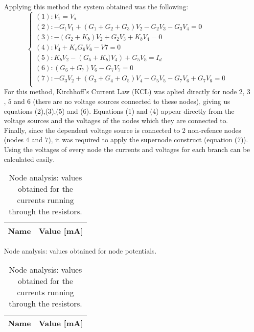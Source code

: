 Applying this method the system obtained was the following:
\begin{equation}
  \begin{cases}
    \left(1\right): V_{1}=V_{a}                                                                        \\
    \left(2\right): -G_{1}V_{1}+\left(G_{1}+G_{2}+G_{3}\right)V_{2}-G_{2}V_{3}-G_{3}V_{4}=0            \\
    \left(3\right): -\left(G_{2}+K_{b}\right)V_{2}+G_{2}V_{3}+K_{b}V_{4}=0                             \\
    \left(4\right): V_{4}+K_{c}G_{6}V_{6}-V{7}=0                                                       \\
    \left(5\right): K_{b}V_{2}-\left(G_{5}+K_{b})V_{4} \right) +G_{5}V_{5}=I_{d}                       \\
    \left(6\right): \left(G_{6}+G_{7}\right)V_{6}-G_{7}V_{7}=0                                         \\
    \left(7\right): -G_{3}V_{2}+\left(G_{3}+G_{4}+G_{5}\right)V_{4}-G_{5}V_{5}-G_{7}V_{6}+G_{7}V_{6}=0 \\
  \end{cases}
\end{equation}
For this method, Kirchhoff's Current Law (KCL) was aplied directly for node $2$, $3$, $5$ and $6$ (there are no voltage sources connected to these nodes), giving us equations (2),(3),(5) and (6). Equations (1) and (4) appear directly from the voltage sources  and the voltages of the nodes which they are connected to. Finally, since the dependent voltage source is connected to 2 non-refence nodes (nodes $4$ and $7$), it was required to apply the supernode construct (equation (7)).
Using the voltages of every node the currents and voltages for each branch can be calculated easily.

\begin{table}[h]
  \centering
  \begin{tabular}{|l|r|}
    \hline
    {\bf Name} & {\bf Value [mA]} \\ \hline
    
  \end{tabular}
  \caption{Node analysis: values obtained for node potentials.}
  \caption{Node analysis: values obtained for the currents running through the resistors.}
  \label{tab:op2}
\end{table}

\begin{table}[h]
  \centering
  \begin{tabular}{|l|r|}
    \hline
    {\bf Name} & {\bf Value [mA]} \\ \hline
    
  \end{tabular}
  \caption{Node analysis: values obtained for the currents running through the resistors.}
  \label{tab:op3}
\end{table}